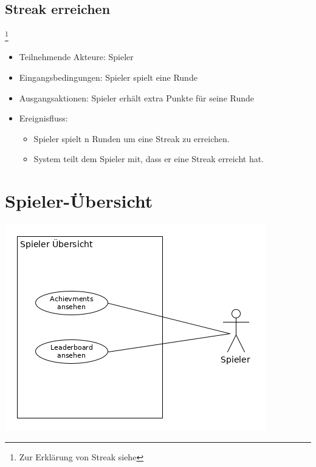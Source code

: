 \documentclass[a4paper]{scrreprt}
\begin{document}
    \subsection{Streak erreichen}\footnote{Zur Erklärung von Streak siehe }
    \begin{itemize}
        \item Teilnehmende Akteure: \Gls{Spieler}
        \item Eingangsbedingungen: \Gls{Spieler} spielt eine Runde
        \item Ausgangsaktionen: \Gls{Spieler} erhält extra Punkte für seine Runde
        \item Ereignisfluss:
        \begin{itemize}
            \item \Gls{Spieler} spielt n Runden um eine Streak zu erreichen.
            \item System teilt dem \Gls{Spieler} mit, dass er eine Streak erreicht hat.
        \end{itemize}
    \end{itemize}
    
\newpage
    \section{Spieler-Übersicht}
    \includegraphics[width=\textwidth]{uml/export/Spieler_Ubersicht.png}
\end{document}
